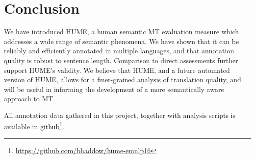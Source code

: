\documentclass[11pt,letterpaper]{article}
\begin{document}
\section{Conclusion}\label{sec:conclusion}

We have introduced HUME, a human semantic MT evaluation measure which addresses
a wide range of semantic phenomena. We have shown that it can be reliably and 
efficiently annotated in multiple languages,
and that annotation quality is robust to sentence length.
Comparison to direct assessments further support HUME's validity.
We believe that HUME, and a future automated version of HUME,
allows for a finer-grained analysis of translation quality,
and will be useful in informing the development of a more semantically aware
approach to MT.

All annotation data gathered in this project, together with analysis scripts is available
in github\footnote{\url{https://github.com/bhaddow/hume-emnlp16}}.
\end{document}
